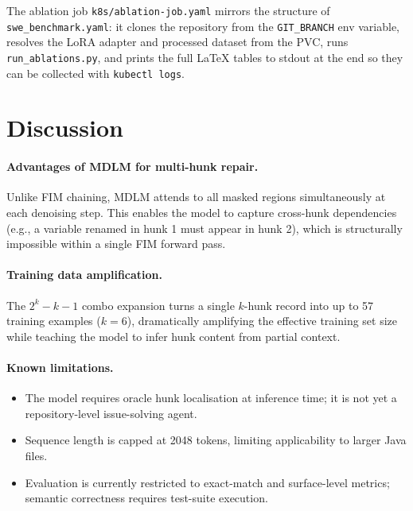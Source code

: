\documentclass[11pt,a4paper]{article}
\begin{document}
The ablation job \texttt{k8s/ablation-job.yaml} mirrors the structure of
\texttt{swe\_benchmark.yaml}: it clones the repository from the
\texttt{GIT\_BRANCH} env variable, resolves the LoRA adapter and processed
dataset from the PVC, runs \texttt{run\_ablations.py}, and prints the
full LaTeX tables to stdout at the end so they can be collected with
\texttt{kubectl logs}.

\section{Discussion}
\label{sec:discussion}

\paragraph{Advantages of MDLM for multi-hunk repair.}
Unlike FIM chaining, MDLM attends to all masked regions simultaneously at each denoising step. This enables the model to capture cross-hunk dependencies (e.g., a variable renamed in hunk 1 must appear in hunk 2), which is structurally impossible within a single FIM forward pass.

\paragraph{Training data amplification.}
The $2^k - k - 1$ combo expansion turns a single $k$-hunk record into up to 57 training examples ($k=6$), dramatically amplifying the effective training set size while teaching the model to infer hunk content from partial context.

\paragraph{Known limitations.}
\begin{itemize}[noitemsep]
  \item The model requires oracle hunk localisation at inference time; it is not yet a repository-level issue-solving agent.
  \item Sequence length is capped at 2048 tokens, limiting applicability to larger Java files.
  \item Evaluation is currently restricted to exact-match and surface-level metrics; semantic correctness requires test-suite execution.
\end{itemize}
\end{document}
